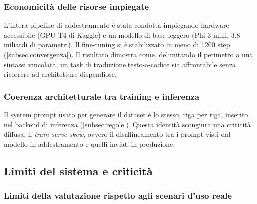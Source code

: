 

\subsubsection{Economicità delle risorse impiegate}

L'intera pipeline di addestramento è stata condotta impiegando hardware accessibile (GPU T4 di Kaggle) e un modello di base leggero (Phi-3-mini, 3.8 miliardi di parametri). Il fine-tuning si è stabilizzato in meno di 1200 step (\cref{subsec:convergenza}). Il risultato dimostra come, delimitando il perimetro a una sintassi vincolata, un task di traduzione testo-a-codice sia affrontabile senza ricorrere ad architetture dispendiose.

\subsubsection{Coerenza architetturale tra training e inferenza}

Il system prompt usato per generare il dataset è lo stesso, riga per riga, inserito nel backend di inferenza (\cref{subsec:regole}). Questa identità scongiura una criticità diffusa: il \textit{train-serve skew}, ovvero il disallineamento tra i prompt visti dal modello in addestramento e quelli inviati in produzione.

\subsection{Limiti del sistema e criticità}\label{subsec:punti_modestia}

\subsubsection{Limiti della valutazione rispetto agli scenari d'uso reale}

